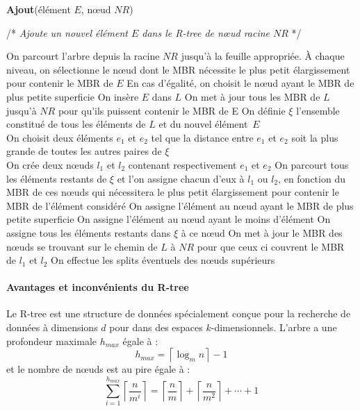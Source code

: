 \begin{algorithm}
\caption{\textbf{Ajout}(élément $E$, nœud $NR$)}
/* \textit{Ajoute un nouvel élément $E$ dans le R-tree de nœud racine $NR$} */
\label{algo:ajout}
\begin{algorithmic}[1]
\STATE On parcourt l'arbre depuis la racine $NR$ jusqu'à la feuille appropriée. À chaque niveau, on sélectionne le nœud dont le MBR nécessite le plus petit élargissement pour contenir le MBR de $E$
\STATE En cas d'égalité, on choisit le nœud ayant le MBR de plus petite \og superficie \fg{}
  \STATE On insère $E$ dans $L$
  \STATE On met à jour tous les MBR de $L$ jusqu'à $NR$ pour qu'ils puissent contenir le MBR de E 
  \STATE On définie $\xi$ l'ensemble constitué de tous les éléments de $L$ et du nouvel élément~$E$\\
On choisit deux éléments $e_1$ et $e_2$ tel que la distance entre $e_1$ et $e_2$ soit la plus grande de toutes les autres paires de $\xi$\\
On crée deux nœuds $l_1$ et $l_2$ contenant respectivement $e_1$ et $e_2$
  \STATE On parcourt tous les éléments restants de $\xi$ et l'on assigne chacun d'eux à $l_1$ ou $l_2$, en fonction du MBR de ces nœuds qui nécessitera le plus petit élargissement pour contenir le MBR de l'élément considéré
    \STATE On assigne l'élément au nœud ayant le MBR de plus petite superficie
      \STATE On assigne l'élément au nœud ayant le moins d'élément
    \ENDIF
  \ENDIF
    \STATE On assigne tous les éléments restants dans $\xi$ à ce nœud
  \ENDIF
  \STATE On met à jour le MBR des nœuds se trouvant sur le chemin de $L$ à $NR$ pour que ceux ci couvrent le MBR de $l_1$ et $l_2$
  \STATE On effectue les \og splits \fg{} éventuels des nœuds supérieurs
\ENDIF 
\end{algorithmic}
\end{algorithm}


\paragraph{Avantages et inconvénients du R-tree} Le R-tree est une structure de données spécialement conçue pour la recherche de données à dimensions $d$ pour dans des espaces $k$-dimensionnels. L'arbre a une profondeur maximale $h_{max}$ égale à :
\begin{equation}
 h_{max} = \left\lceil\log_{m} n\right\rceil - 1
\end{equation}
et le nombre de nœuds est au pire égale à :
\begin{equation}
 \sum_{i=1}^{h_{max}}{\left\lceil\frac{n}{m^i}\right\rceil} = \left\lceil\frac{n}{m}\right\rceil + \left\lceil\frac{n}{m^2}\right\rceil + \cdots + 1
\end{equation}

